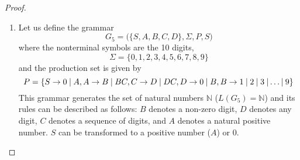 \documentclass[11pt]{article}
\begin{document}
\begin{proof}
\begin{enumerate}
        \item Let us define the grammar
        \begin{equation}
            G_5 = \big(\{S, A, B, C, D\}, \Sigma, P, S\big)
        \end{equation}
        where the nonterminal symbols are the 10 digits,
        \begin{equation}
            \Sigma = \{0, 1, 2, 3, 4, 5, 6, 7, 8, 9\}
        \end{equation}
        and the production set is given by
        \begin{equation}
            P = \{
                S \to 0 \hspace{0.25em}|\hspace{0.25em} A,
                A \to B \hspace{0.25em}|\hspace{0.25em} BC,
                C \to D \hspace{0.25em}|\hspace{0.25em} DC,
                D \to 0 \hspace{0.25em}|\hspace{0.25em} B,
                B \to 1 \hspace{0.25em} | \hspace{0.25em} 2
                \hspace{0.25em} | \hspace{0.25em} 3 \hspace{0.25em} |
                \ldots | \hspace{0.25em} 9
            \}
        \end{equation}
        This grammar generates the set of natural numbers $\mathbb{N}$ ($L(G_5) = \mathbb{N}$) 
        and its rules can be described as follows:
        $B$ denotes a non-zero digit, $D$ denotes any digit, $C$ denotes a
        sequence of digits, and $A$ denotes a natural positive number. $S$ 
        can be transformed to a positive number ($A$) or 0.


\end{enumerate}
\end{proof}
\end{document}
